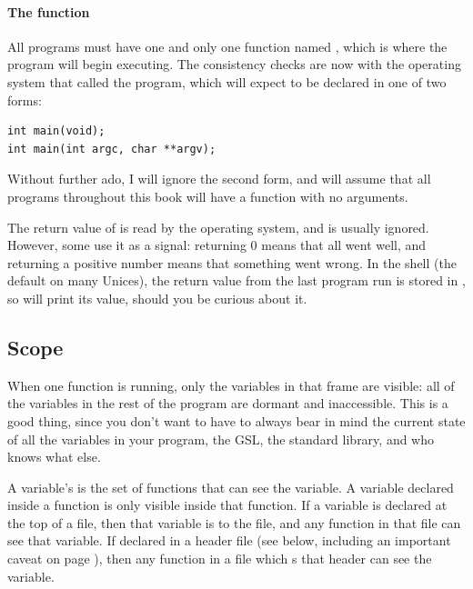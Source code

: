 
\paragraph{\treesymbol{} The  function}
All programs must have one and only one function named ,
which is where the program will begin executing. The consistency checks
are now with the operating system that called the program, which will
expect  to be declared in one of two forms:

\begin{lstlisting}
int main(void);
int main(int argc, char **argv);
\end{lstlisting}

Without further ado, I will ignore the second form, and will assume that
all programs throughout this book will have a  function
with no arguments.

The return value of  is read by the operating system,
and is usually ignored. However, some use it as a signal:  returning
0 means that all went well, and returning a positive number means that
something went wrong. In the  shell (the default on many
Unices), the return value from the last program run is stored in
, so  will print its value, should you
be curious about it.

\subsection{Scope}	\label{scope} 

When one function is running, only the variables in that frame are
visible: all of the variables in the rest of the program are 
dormant and inaccessible.  This is a good thing, since you 
don't want to have to always bear in mind the current state of all the
variables in your program, the GSL, the standard library, and who knows
what else.

A variable's  is the set of functions that can see the
variable. A variable declared inside a function is only visible inside
that function.  If a variable is declared at the top of a file, then
that variable is  to the file, and any function in that
file can see that variable. If declared in a header file (see below,
including an important caveat on page \pageref{extern}),
then any function in a file which s that header  can see
the variable.

